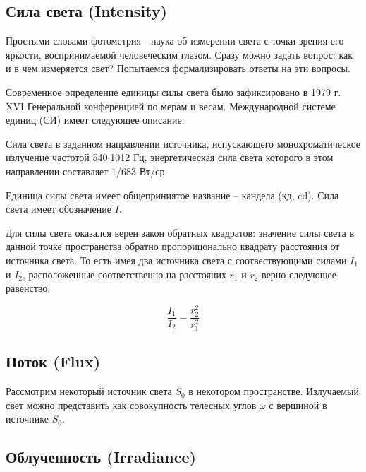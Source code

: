 \documentclass[12pt]{article}
\begin{document}
\newpage

\subsection{Сила света (Intensity)}

Простыми словами фотометрия - наука об измерении света с точки
зрения его яркости, воспринимаемой человеческим глазом.
Сразу можно задать вопрос: как и в чем измеряется
свет? Попытаемся формализировать ответы на эти вопросы.


Современное определение единицы силы света было зафиксировано в 1979 г.
XVI Генеральной конференцией по мерам и весам. Международной системе единиц (СИ)
имеет следующее описание:

\begin{displayquote}
  Сила света в заданном направлении источника, испускающего
  монохроматическое излучение частотой 540$\cdot$1012 Гц, энергетическая сила света
  которого в этом направлении составляет 1/683 Вт/ср.
\end{displayquote}

Единица силы света имеет общеприниятое название -- кандела (кд, cd).
Сила света имеет обозначение $I$.

Для силы света оказался верен закон обратных квадратов: значение силы света в
данной точке пространства обратно пропорицонально квадрату расстояния от источника света.
То есть имея два источника света с соотвествующими силами $I_1$ и $I_2$, расположенные
соответственно на расстояних $r_1$ и $r_2$ верно следующее равенство:

\begin{equation}
  \frac{I_1}{I_2} = \frac{r_2^2}{r_1^2}
\end{equation}

\subsection{Поток (Flux)}

Рассмотрим некоторый источник света $S_0$ в некотором пространстве.
Излучаемый свет можно представить как совокупность телесных углов $\omega$ с вершиной
в источнике $S_0$.


\subsection{Облученность (Irradiance)}
\end{document}
